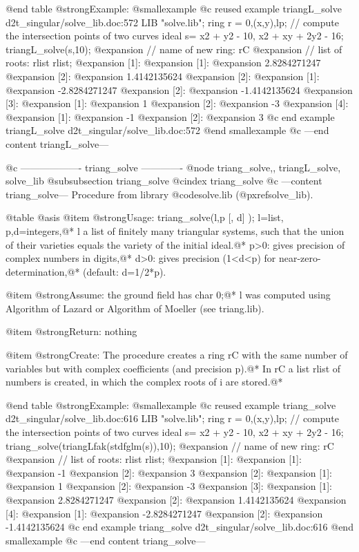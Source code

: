 @end table
@strong{Example:}
@smallexample
@c reused example triangL_solve d2t_singular/solve_lib.doc:572 
LIB "solve.lib";
ring r = 0,(x,y),lp;
// compute the intersection points of two curves
ideal s=  x2 + y2 - 10, x2 + xy + 2y2 - 16;
triangL_solve(s,10);
@expansion{} // name of new ring: rC
@expansion{} // list of roots: rlist
rlist;
@expansion{} [1]:
@expansion{}    [1]:
@expansion{}       2.8284271247
@expansion{}    [2]:
@expansion{}       1.4142135624
@expansion{} [2]:
@expansion{}    [1]:
@expansion{}       -2.8284271247
@expansion{}    [2]:
@expansion{}       -1.4142135624
@expansion{} [3]:
@expansion{}    [1]:
@expansion{}       1
@expansion{}    [2]:
@expansion{}       -3
@expansion{} [4]:
@expansion{}    [1]:
@expansion{}       -1
@expansion{}    [2]:
@expansion{}       3
@c end example triangL_solve d2t_singular/solve_lib.doc:572
@end smallexample
@c ---end content triangL_solve---

@c ------------------- triang_solve -------------
@node triang_solve,, triangL_solve, solve_lib
@subsubsection triang_solve
@cindex triang_solve
@c ---content triang_solve---
Procedure from library @code{solve.lib} (@pxref{solve_lib}).

@table @asis
@item @strong{Usage:}
triang_solve(l,p [, d] ); l=list, p,d=integers,@*
l a list of finitely many triangular systems, such that the union of
their varieties equals the variety of the initial ideal.@*
p>0: gives precision of complex numbers in digits,@*
d>0: gives precision (1<d<p) for near-zero-determination,@*
(default: d=1/2*p).

@item @strong{Assume:}
the ground field has char 0;@*
l was computed using Algorithm of Lazard or Algorithm of Moeller
(see triang.lib).

@item @strong{Return:}
nothing

@item @strong{Create:}
The procedure creates a ring rC with the same number of variables but
with complex coefficients (and precision p).@*
In rC a list rlist of numbers is created, in which the complex
roots of i are stored.@*

@end table
@strong{Example:}
@smallexample
@c reused example triang_solve d2t_singular/solve_lib.doc:616 
LIB "solve.lib";
ring r = 0,(x,y),lp;
// compute the intersection points of two curves
ideal s=  x2 + y2 - 10, x2 + xy + 2y2 - 16;
triang_solve(triangLfak(stdfglm(s)),10);
@expansion{} // name of new ring: rC
@expansion{} // list of roots: rlist
rlist;
@expansion{} [1]:
@expansion{}    [1]:
@expansion{}       -1
@expansion{}    [2]:
@expansion{}       3
@expansion{} [2]:
@expansion{}    [1]:
@expansion{}       1
@expansion{}    [2]:
@expansion{}       -3
@expansion{} [3]:
@expansion{}    [1]:
@expansion{}       2.8284271247
@expansion{}    [2]:
@expansion{}       1.4142135624
@expansion{} [4]:
@expansion{}    [1]:
@expansion{}       -2.8284271247
@expansion{}    [2]:
@expansion{}       -1.4142135624
@c end example triang_solve d2t_singular/solve_lib.doc:616
@end smallexample
@c ---end content triang_solve---
